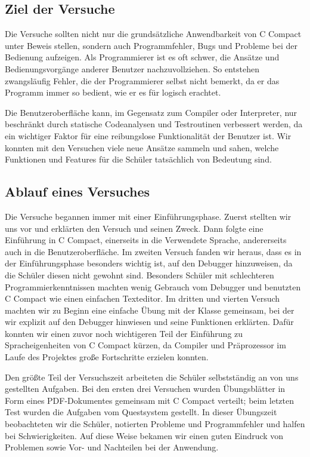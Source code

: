 \subsection{Ziel der Versuche}
Die Versuche sollten nicht nur die grundsätzliche Anwendbarkeit von C Compact unter Beweis stellen, sondern auch Programmfehler, Bugs und Probleme bei der Bedienung aufzeigen. Als Programmierer ist es oft schwer, die Ansätze und Bedienungsvorgänge anderer Benutzer nachzuvollziehen. So entstehen zwangsläufig Fehler, die der Programmierer selbst nicht bemerkt, da er das Programm immer so bedient, wie er es für logisch erachtet.

Die Benutzeroberfläche kann, im Gegensatz zum Compiler oder Interpreter, nur beschränkt durch statische Codeanalysen und Testroutinen verbessert werden, da ein wichtiger Faktor für eine reibungslose Funktionalität der Benutzer ist. Wir konnten mit den Versuchen viele neue Ansätze sammeln und sahen, welche Funktionen und Features für die Schüler tatsächlich von Bedeutung sind.

\subsection{Ablauf eines Versuches}
\label{sec:sci-trials-gui-sched}
Die Versuche begannen immer mit einer Einführungsphase. Zuerst stellten wir uns vor und erklärten den Versuch und seinen Zweck. Dann folgte eine Einführung in C Compact, einerseits in die Verwendete Sprache, andererseits auch in die Benutzeroberfläche. Im zweiten Versuch fanden wir heraus, dass es in der Einführungsphase besonders wichtig ist, auf den Debugger hinzuweisen, da die Schüler diesen nicht gewohnt sind. Besonders Schüler mit schlechteren Programmierkenntnissen machten wenig Gebrauch vom Debugger und benutzten C Compact wie einen einfachen Texteditor. Im dritten und vierten Versuch machten wir zu Beginn eine einfache Übung mit der Klasse gemeinsam, bei der wir explizit auf den Debugger hinwiesen und seine Funktionen erklärten. Dafür konnten wir einen zuvor noch wichtigeren Teil der Einführung zu Spracheigenheiten von C Compact kürzen, da Compiler und Präprozessor im Laufe des Projektes große Fortschritte erzielen konnten.

Den größte Teil der Versuchszeit arbeiteten die Schüler selbstständig an von uns gestellten Aufgaben. Bei den ersten drei Versuchen wurden Übungsblätter in Form eines PDF-Dokumentes gemeinsam mit C Compact verteilt; beim letzten Test wurden die Aufgaben vom Questsystem gestellt. In dieser Übungszeit beobachteten wir die Schüler, notierten Probleme und Programmfehler und halfen bei Schwierigkeiten. Auf diese Weise bekamen wir einen guten Eindruck von Problemen sowie Vor- und Nachteilen bei der Anwendung.

